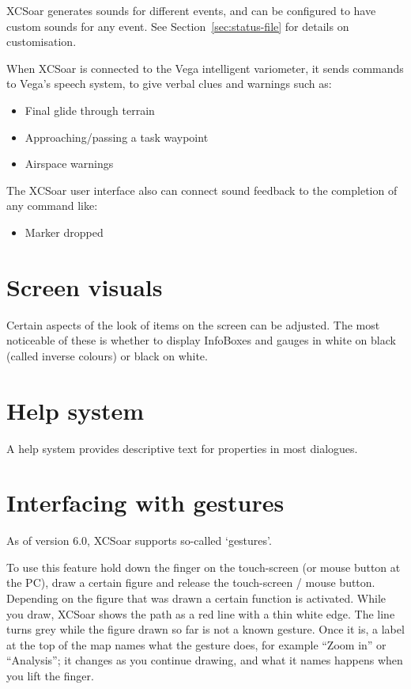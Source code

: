 XCSoar generates sounds for different events, and can be configured to
have custom sounds for any event.  See Section~\ref{sec:status-file} for
details on customisation.

When XCSoar is connected to the Vega intelligent variometer, it sends
commands to Vega's speech system, to give verbal clues and warnings such as:
\begin{itemize}
\item Final glide through terrain
\item Approaching/passing a task waypoint
\item Airspace warnings
\end{itemize}

The XCSoar user interface also can connect sound feedback to the completion 
of any command like:
\begin{itemize}
\item Marker dropped
\end{itemize}


\section{Screen visuals}

Certain aspects of the look of items on the screen can be adjusted.
The most noticeable of these is whether to display InfoBoxes and
gauges in white on black (called inverse colours) or black on white.


\section{Help system}

A help system provides descriptive text for properties in most
dialogues.

\section{Interfacing with gestures}\label{sec:gestures}
As of version 6.0, XCSoar supports so-called `gestures'.

To use this feature hold down the finger on the 
touch-screen (or mouse button at the PC), draw a certain figure and release 
the touch-screen / mouse button. Depending on the figure that was drawn 
a certain function is activated. 
While you draw, XCSoar shows the path as a red line with a thin
white edge.  The line turns grey while the figure drawn so far is not
a known gesture.  Once it is, a label at the top of the map names
what the gesture does, for example ``Zoom in'' or ``Analysis''; it
changes as you continue drawing, and what it names happens when you
lift the finger.

